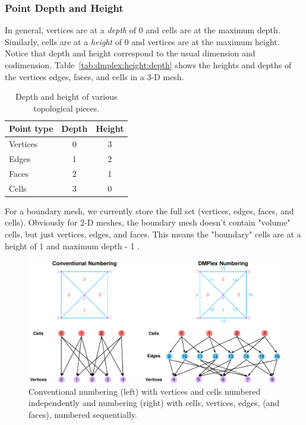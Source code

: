 \subsubsection{Point Depth and Height}

In general, vertices are at a \textit{depth} of 0 and cells are at the
maximum depth. Similarly, cells are at a \textit{height} of 0 and
vertices are at the maximum height. Notice that depth and height
correspond to the usual dimension and
codimension. Table~\vref{tab:dmplex:height:depth} shows the heights
and depths of the vertices edges, faces, and cells in a 3-D mesh.

\begin{table}[htbp]
  \caption{Depth and height of various topological pieces.}
  \label{tab:dmplex:height:depth}
  \begin{center}
    \begin{tabular}{lcc}
      \hline
      Point type & Depth & Height \\
      \hline
      Vertices  &  0  &  3 \\
      Edges  &  1  &  2 \\
      Faces  &  2  &  1 \\
      Cells  &  3  &  0 \\
      \hline
    \end{tabular}
  \end{center}
\end{table}

For a boundary mesh, we currently store the full set (vertices, edges, faces, and cells). Obviously for 2-D meshes, the
boundary mesh doesn't contain "volume" cells, but just vertices, edges, and faces. This means the "boundary" cells are
at a height of 1 and maximum depth - 1 .

\begin{figure}
  \includegraphics{developer/figs/meshtopology}
  \caption{Conventional numbering (left) with vertices and cells numbered independently and  numbering (right)
  with cells, vertices, edges, (and faces), numbered sequentially.}
  \label{fig:developer:mesh:topology}
\end{figure}

